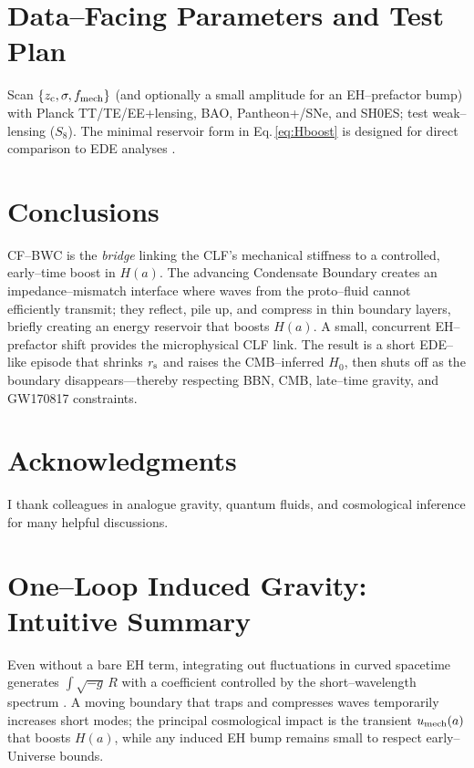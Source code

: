 \documentclass[11pt,a4paper]{article}
\newcommand{\rs}{r_{\rm s}}
\newcommand{\zc}{z_{\rm c}}
\begin{document}
\section{Data--Facing Parameters and Test Plan}
Scan $\{\zc,\sigma,f_{\rm mech}\}$ (and optionally a small amplitude for an EH--prefactor bump) with Planck TT/TE/EE+lensing, BAO, Pantheon+/SNe, and SH0ES; test weak--lensing ($S_8$). The minimal reservoir form in Eq.\,\eqref{eq:Hboost} is designed for direct comparison to EDE analyses \cite{Planck2018,RiessReview2024}.

\section{Conclusions}
CF--BWC is the \emph{bridge} linking the CLF's mechanical stiffness to a controlled, early--time boost in $H(a)$. The advancing Condensate Boundary creates an impedance--mismatch interface where waves from the proto--fluid cannot efficiently transmit; they reflect, pile up, and compress in thin boundary layers, briefly creating an energy reservoir that boosts $H(a)$. A small, concurrent EH--prefactor shift provides the microphysical CLF link. The result is a short EDE--like episode that shrinks $\rs$ and raises the CMB--inferred $H_0$, then shuts off as the boundary disappears—thereby respecting BBN, CMB, late--time gravity, and GW170817 constraints.

\section*{Acknowledgments}
I thank colleagues in analogue gravity, quantum fluids, and cosmological inference for many helpful discussions.

\appendix
\section{One--Loop Induced Gravity: Intuitive Summary}
Even without a bare EH term, integrating out fluctuations in curved spacetime generates $\int \sqrt{-g}\,R$ with a coefficient controlled by the short--wavelength spectrum \cite{Sakharov1967,Vassilevich2003}. A moving boundary that traps and compresses waves temporarily increases short modes; the principal cosmological impact is the transient $u_{\rm mech}(a)$ that boosts $H(a)$, while any induced EH bump remains small to respect early--Universe bounds.
\end{document}
